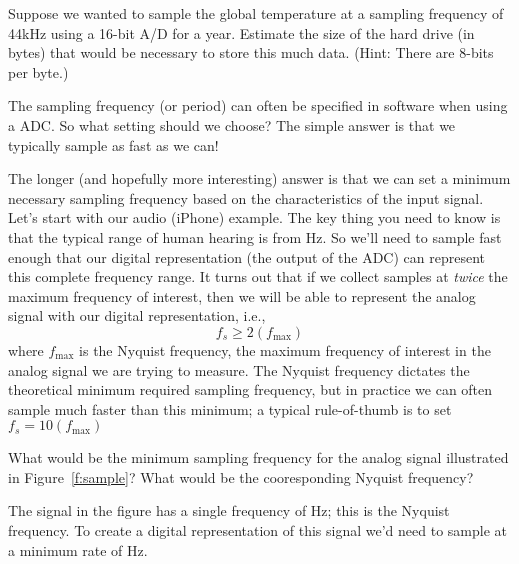 \begin{ex}
Suppose we wanted to sample the global temperature at a sampling frequency of \unit{44}{kHz} using a 16-bit A/D for a year.  Estimate the size of the hard drive (in bytes) that would be necessary to store this much data.  (Hint: There are 8-bits per byte.)
\end{ex}

The sampling frequency (or period) can often be specified in software when using a ADC.  So what setting should we choose?  The simple answer is that we typically sample as fast as we can!

The longer (and hopefully more interesting) answer is that we can set a minimum necessary sampling frequency based on the characteristics of the input signal.  Let's start with our audio (iPhone) example.  The key thing you need to know is that the typical range of human hearing is from \unit[20--20,000]{Hz}.  So we'll need to sample fast enough that our digital representation (the output of the ADC) can represent this complete frequency range.  It turns out that if we collect samples at \emph{twice} the maximum frequency of interest, then we will be able to represent the analog signal with our digital representation, i.e.,
\[
f_s \geq 2\left(f_{\mathrm{max}}\right)
\]
where $f_{\mathrm{max}}$ is the \gls{Nyquist frequency}, the maximum frequency of interest in the analog signal we are trying to measure.  The Nyquist frequency dictates the theoretical minimum required sampling frequency, but in practice we can often sample much faster than this minimum; a typical rule-of-thumb is to set $f_s = 10(f_{\mathrm{max}})$

\begin{ex}
What would be the minimum sampling frequency for the analog signal illustrated in Figure~\ref{f:sample}?  What would be the cooresponding Nyquist frequency?
\end{ex}

\ifsolutions
\begin{soln}
The signal in the figure has a single frequency of \unit[1]{Hz}; this is the Nyquist frequency.  To create a digital representation of this signal we'd need to sample at a minimum rate of \unit[2]{Hz}.
\end{soln}
\fi

